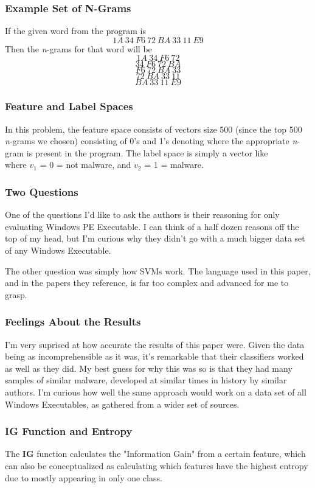 \documentclass{article}
\begin{document}
\newpage
\subsubsection{Example Set of N-Grams}
If the given word from the program is 
\[ 1A\ 34\ F6\ 72\ BA\ 33\ 11\ E9 \]
Then the \textit{n}-grams for that word will be
\[ 1A\ 34\ F6\ 72 \]
\[ 34\ F6\ 72\ BA \]
\[ F6\ 72\ BA\ 33 \]
\[ 72\ BA\ 33\ 11 \]
\[ BA\ 33\ 11\ E9 \]

\subsubsection{Feature and Label Spaces}
In this problem, the feature space consists of vectors size 500 (since the top 500 \textit{n}-grams we chosen) consisting of 0's and 1's denoting where the appropriate \textit{n}-gram is present in the program. The label space is simply a vector like \[<0,1>\] where $v_1$ = 0 = not malware, and $v_2$ = 1 = malware.

\subsubsection{Two Questions}
One of the questions I'd like to ask the authors is their reasoning for only evaluating Windows PE Executable. I can think of a half dozen reasons off the top of my head, but I'm curious why they didn't go with a much bigger data set of any Windows Executable.

The other question was simply how SVMs work. The language used in this paper, and in the papers they reference, is far too complex and advanced for me to grasp.

\subsubsection{Feelings About the Results}
I'm very suprised at how accurate the results of this paper were. Given the data being as incomprehensible as it was, it's remarkable that their classifiers worked as well as they did. My best guess for why this was so is that they had many samples of similar malware, developed at similar times in history by similar authors. I'm curious how well the same approach would work on a data set of all Windows Executables, as gathered from a wider set of sources.

\subsubsection{IG Function and Entropy}
The \textbf{IG} function calculates the "Information Gain" from a certain feature, which can also be conceptualized as calculating which features have the highest entropy due to mostly appearing in only one class.
\end{document}
